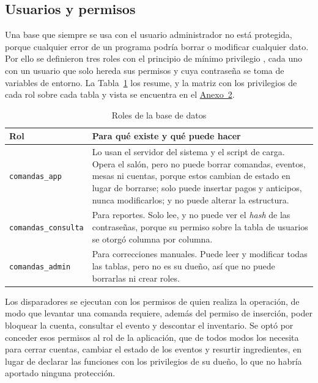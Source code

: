 \subsection{Usuarios y permisos}

Una base que siempre se usa con el usuario administrador no está protegida, porque cualquier error de un programa podría borrar o modificar cualquier dato. Por ello se definieron tres roles con el principio de mínimo privilegio \parencites{postgres_roles}{postgres_privileges}, cada uno con un usuario que solo hereda sus permisos y cuya contraseña se toma de variables de entorno. La Tabla~\ref{tab:roles} los resume, y la matriz con los privilegios de cada rol sobre cada tabla y vista se encuentra en el \hyperref[anexo:permisos]{Anexo~2}.

\begin{table}[H]
    \centering
    \small
    \begin{tabularx}{\textwidth}
        {
            >{\RaggedRight\arraybackslash}p{3.2cm}
            >{\RaggedRight\arraybackslash}X
        }
        \toprule
        \textbf{Rol} & \textbf{Para qué existe y qué puede hacer} \\
        \midrule
        \texttt{comandas\_app} & Lo usan el servidor del sistema y el script de carga. Opera el salón, pero no puede borrar comandas, eventos, mesas ni cuentas, porque estos cambian de estado en lugar de borrarse; solo puede insertar pagos y anticipos, nunca modificarlos; y no puede alterar la estructura. \\
        \texttt{comandas\_consulta} & Para reportes. Solo lee, y no puede ver el \textit{hash} de las contraseñas, porque su permiso sobre la tabla de usuarios se otorgó columna por columna. \\
        \texttt{comandas\_admin} & Para correcciones manuales. Puede leer y modificar todas las tablas, pero no es su dueño, así que no puede borrarlas ni crear roles. \\
        \bottomrule
    \end{tabularx}
    \captionsetup{labelfont=bf, textfont=it, labelsep=newline, justification=raggedright, singlelinecheck=false}
    \caption{Roles de la base de datos}
    \label{tab:roles}
\end{table}

Los disparadores se ejecutan con los permisos de quien realiza la operación, de modo que levantar una comanda requiere, además del permiso de inserción, poder bloquear la cuenta, consultar el evento y descontar el inventario. Se optó por conceder esos permisos al rol de la aplicación, que de todos modos los necesita para cerrar cuentas, cambiar el estado de los eventos y resurtir ingredientes, en lugar de declarar las funciones con los privilegios de su dueño, lo que no habría aportado ninguna protección.

